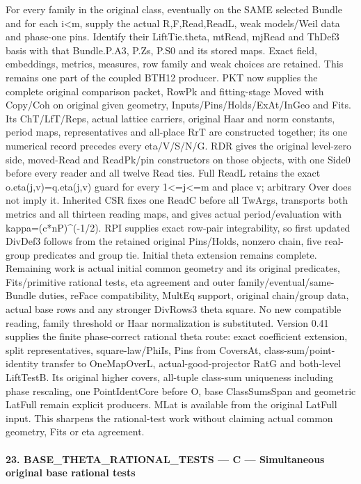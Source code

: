 For every family in the original class, eventually on the SAME selected Bundle and for each i<m, supply the actual R,F,Read,ReadL, weak models/Weil data and phase-one pins. Identify their LiftTie.theta, mtRead, mjRead and ThDef3 basis with that Bundle.P.A3, P.Zs, P.S0 and its stored maps. Exact field, embeddings, metrics, measures, row family and weak choices are retained. This remains one part of the coupled BTH12 producer. PKT now supplies the complete original comparison packet, RowPk and fitting-stage Moved with Copy/Coh on original given geometry, Inputs/Pins/Holds/ExAt/InGeo and Fits. Its ChT/LfT/Reps, actual lattice carriers, original Haar and norm constants, period maps, representatives and all-place RrT are constructed together; its one numerical record precedes every eta/V/S/N/G. RDR gives the original level-zero side, moved-Read and ReadPk/pin constructors on those objects, with one Side0 before every reader and all twelve Read ties. Full ReadL retains the exact o.eta(j,v)=q.eta(j,v) guard for every 1<=j<=m and place v; arbitrary Over does not imply it. Inherited CSR fixes one ReadC before all TwArgs, transports both metrics and all thirteen reading maps, and gives actual period/evaluation with kappa=(c*nP)\textasciicircum{}(-1/2). RPI supplies exact row-pair integrability, so first updated DivDef3 follows from the retained original Pins/Holds, nonzero chain, five real-group predicates and group tie. Initial theta extension remains complete. Remaining work is actual initial common geometry and its original predicates, Fits/primitive rational tests, eta agreement and outer family/eventual/same-Bundle duties, reFace compatibility, MultEq support, original chain/group data, actual base rows and any stronger DivRows3 theta square. No new compatible reading, family threshold or Haar normalization is substituted. Version 0.41 supplies the finite phase-correct rational theta route: exact coefficient extension, split representatives, square-law/PhiIs, Pins from CoversAt, class-sum/point-identity transfer to OneMapOverL, actual-good-projector RatG and both-level LiftTestB. Its original higher covers, all-tuple class-sum uniqueness including phase rescaling, one PointIdentCore before O, base ClassSumsSpan and geometric LatFull remain explicit producers. MLat is available from the original LatFull input. This sharpens the rational-test work without claiming actual common geometry, Fits or eta agreement.



\paragraph{23. BASE\_\allowbreak THETA\_\allowbreak RATIONAL\_\allowbreak TESTS — C — Simultaneous original base rational tests}

